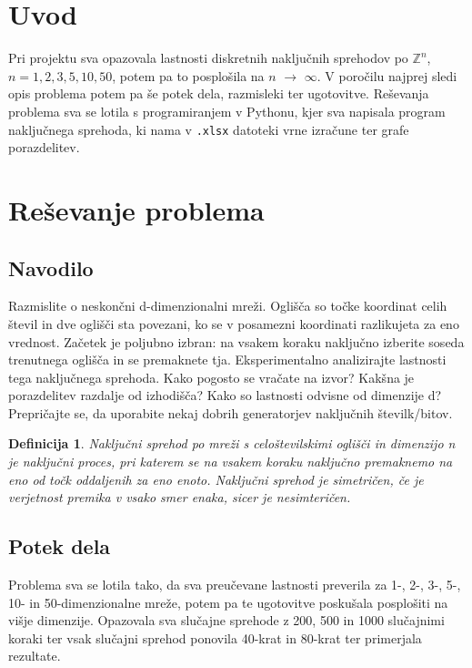 \documentclass[a4paper,oneside,12pt]{article}
\newtheorem{definicija}{Definicija}
\begin{document}
\section{Uvod}
Pri projektu sva opazovala lastnosti diskretnih naključnih sprehodov po $\mathbb{Z}^n$,\\ $n = 1, 2, 3, 5, 10, 50$, potem pa to posplošila na $n$ $\rightarrow$ $\infty$. V poročilu najprej sledi opis problema potem pa še potek dela, 
razmisleki ter ugotovitve. Reševanja problema sva se lotila s programiranjem v Pythonu, kjer sva napisala program naključnega sprehoda, ki nama v \texttt{.xlsx} datoteki vrne izračune ter grafe porazdelitev. 

\section{Reševanje problema}

\subsection{Navodilo}
Razmislite o neskončni d-dimenzionalni mreži. Oglišča so točke koordinat celih števil in dve oglišči sta povezani, ko se v posamezni koordinati razlikujeta za eno vrednost. 
Začetek je poljubno izbran: na vsakem koraku naključno izberite soseda trenutnega oglišča in se premaknete tja. Eksperimentalno analizirajte lastnosti tega naključnega sprehoda. 
Kako pogosto se vračate na izvor? Kakšna je porazdelitev razdalje od izhodišča? Kako so lastnosti odvisne od dimenzije d? Prepričajte se, da uporabite nekaj dobrih generatorjev naključnih številk/bitov.


\begin{definicija} Naključni sprehod po mreži s celoštevilskimi oglišči in dimenzijo n je naključni proces, pri katerem se na vsakem koraku naključno premaknemo na eno od točk oddaljenih za eno enoto. Naključni sprehod je simetričen, če je verjetnost premika v vsako smer enaka, sicer je nesimteričen.
\end{definicija}

\subsection{Potek dela}
Problema sva se lotila tako, da sva preučevane lastnosti preverila za 1-, 2-, 3-, 5-, 10- in 50-dimenzionalne mreže, potem pa te ugotovitve poskušala posplošiti na višje dimenzije. 
Opazovala sva slučajne sprehode z 200, 500 in 1000 slučajnimi koraki ter vsak slučajni sprehod ponovila 40-krat in 80-krat ter primerjala rezultate. \\
\end{document}
